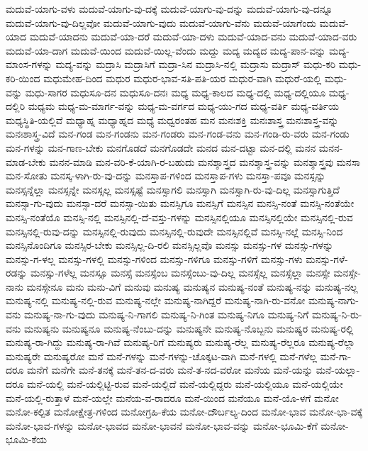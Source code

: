 {ಮದುವೆ-ಯಾಗು-ವಳು
ಮದುವೆ-ಯಾಗು-ವು-ದಕ್ಕೆ
ಮದುವೆ-ಯಾಗು-ವು-ದನ್ನು
ಮದುವೆ-ಯಾಗು-ವು-ದನ್ನೂ
ಮದುವೆ-ಯಾಗು-ವು-ದಿಲ್ಲವೋ
ಮದುವೆ-ಯಾಗು-ವುದು
ಮದುವೆ-ಯಾಗು-ವೆನು
ಮದುವೆ-ಯಾಗೆಂದು
ಮದುವೆ-ಯಾದ
ಮದುವೆ-ಯಾದನು
ಮದುವೆ-ಯಾ-ದರೆ
ಮದುವೆ-ಯಾ-ದಳು
ಮದುವೆ-ಯಾದ-ವನು
ಮದುವೆ-ಯಾದ-ವರು
ಮದುವೆ-ಯಾ-ದಾಗ
ಮದುವೆ-ಯಿಂದ
ಮದುವೆ-ಯಿಲ್ಲ-ವೆಂದು
ಮದ್ದು
ಮದ್ಯ
ಮದ್ಯದ
ಮದ್ಯ-ಪಾನ-ವನ್ನು
ಮದ್ಯ-ಮಾಂಸ-ಗಳನ್ನು
ಮದ್ಯ-ವನ್ನು
ಮದ್ರಾಸಿ
ಮದ್ರಾಸಿಗೆ
ಮದ್ರಾ-ಸಿನ
ಮದ್ರಾಸಿ-ನಲ್ಲಿ
ಮದ್ರಾಸು
ಮದ್ರಾಸ್
ಮಧು-ಕರಿ
ಮಧು-ಕರಿ-ಯಿಂದ
ಮಧುಮೇಹ-ದಿಂದ
ಮಧುರ
ಮಧುರ-ಭಾವ-ಸತಿ-ಪತಿ-ಯರ
ಮಧುರ-ವಾಗಿ
ಮಧುರೆ-ಯಲ್ಲಿ
ಮಧು-ವನ್ನು
ಮಧು-ಸಾಗರ
ಮಧುಸೂ-ದನ
ಮಧುಸೂ-ದನಃ
ಮಧ್ಯ
ಮಧ್ಯ-ಕಾಲದ
ಮಧ್ಯ-ದಲ್ಲಿ
ಮಧ್ಯ-ದಲ್ಲಿಯೂ
ಮಧ್ಯ-ದಲ್ಲಿರಿ
ಮಧ್ಯಮ
ಮಧ್ಯ-ಮ-ಮಾರ್ಗ-ವನ್ನು
ಮಧ್ಯ-ಮ-ವರ್ಗದ
ಮಧ್ಯ-ಯು-ಗದ
ಮಧ್ಯ-ವರ್ತಿ
ಮಧ್ಯ-ವರ್ತಿಯ
ಮಧ್ಯಸ್ಥಿತಿ-ಯಲ್ಲಿವೆ
ಮಧ್ಯಾಹ್ನ
ಮಧ್ಯಾಹ್ನದ
ಮಧ್ಯೆ
ಮಧ್ವರಂತಹ
ಮನ
ಮನಃಶಕ್ತಿ
ಮನಃಶಾಸ್ತ್ರ
ಮನಃಶಾಸ್ತ್ರ-ವನ್ನು
ಮನಃಶಾಸ್ತ್ರ-ವಿದೆ
ಮನ-ಗಂಡ
ಮನ-ಗಂಡನು
ಮನ-ಗಂಡರು
ಮನ-ಗಂಡ-ವನು
ಮನ-ಗಂಡಿ-ರು-ವರು
ಮನ-ಗಂಡು
ಮನ-ಗಳನ್ನು
ಮನ-ಗಾಣ-ಬೇಕು
ಮನಗೊಡದೆ
ಮನಗೊಡದೇ
ಮನದ
ಮನ-ದಟ್ಟಾ
ಮನ-ದಲ್ಲಿ
ಮನನ
ಮನನ-ಮಾಡ-ಬೇಕು
ಮನನ-ಮಾಡಿ
ಮನ-ವರಿ-ಕೆ-ಯಾಗಿ-ರ-ಬಹುದು
ಮನಶ್ಶಾಸ್ತ್ರದ
ಮನಶ್ಶಾಸ್ತ್ರ-ವನ್ನು
ಮನಶ್ಶಾಸ್ತ್ರವು
ಮನಸಾ
ಮನ-ಸೋತು
ಮನಸ್ಕ-ಳಾಗಿ-ರು-ವು-ದನ್ನು
ಮನಸ್ತಾಪ-ಗಳಿಂದ
ಮನಸ್ತಾಪ-ಗಳು
ಮನಸ್ತಾ-ಪವೂ
ಮನಸ್ಸನ್ನು
ಮನಸ್ಸನ್ನೆಲ್ಲಾ
ಮನಸ್ಸನ್ನೇ
ಮನಸ್ಸಲ್ಲ
ಮನಸ್ಸಷ್ಟೆ
ಮನಸ್ಸಾಗಲಿ
ಮನಸ್ಸಾಗಿ
ಮನಸ್ಸಾಗಿ-ರು-ವು-ದಿಲ್ಲ
ಮನಸ್ಸಾಗುತ್ತಿದೆ
ಮನಸ್ಸಾ-ಗು-ವುದು
ಮನಸ್ಸಾ-ದರೆ
ಮನಸ್ಸಾ-ಯಿತು
ಮನಸ್ಸಿಗೂ
ಮನಸ್ಸಿಗೆ
ಮನಸ್ಸಿನ
ಮನಸ್ಸಿ-ನಂತೆ
ಮನಸ್ಸಿ-ನಂತೆಯೇ
ಮನಸ್ಸಿ-ನಂತೆಯೊ
ಮನಸ್ಸಿ-ನಲ್ಲಿ
ಮನಸ್ಸಿನಲ್ಲಿ-ದೆ-ವಸ್ತು-ಗಳನ್ನು
ಮನಸ್ಸಿನಲ್ಲಿಯೂ
ಮನಸ್ಸಿನಲ್ಲಿಯೇ
ಮನಸ್ಸಿನಲ್ಲಿ-ರುವ
ಮನಸ್ಸಿನಲ್ಲಿ-ರುವು-ದನ್ನು
ಮನಸ್ಸಿನಲ್ಲಿ-ರುವುದು
ಮನಸ್ಸಿನಲ್ಲಿ-ರುವುದೇ
ಮನಸ್ಸಿನಲ್ಲಿವೆ
ಮನಸ್ಸಿ-ನಲ್ಲೆ
ಮನಸ್ಸಿ-ನಿಂದ
ಮನಸ್ಸಿನೊಂದಿಗೂ
ಮನಸ್ಸಿರ-ಬೇಕು
ಮನಸ್ಸಿಲ್ಲ-ದಿ-ರಲಿ
ಮನಸ್ಸಿಲ್ಲವೊ
ಮನಸ್ಸು
ಮನಸ್ಸು-ಗಳ
ಮನಸ್ಸು-ಗಳನ್ನು
ಮನಸ್ಸು-ಗ-ಳಲ್ಲ
ಮನಸ್ಸು-ಗಳಲ್ಲಿ
ಮನಸ್ಸು-ಗಳಿಂದ
ಮನಸ್ಸು-ಗಳಿಗೂ
ಮನಸ್ಸು-ಗಳಿಗೆ
ಮನಸ್ಸು-ಗಳು
ಮನಸ್ಸು-ಗಳೆ-ರಡನ್ನು
ಮನಸ್ಸು-ಗಳೆಲ್ಲ
ಮನಸ್ಸೂ
ಮನಸ್ಸೆ
ಮನಸ್ಸೆಂಬ
ಮನಸ್ಸೆಂಬು-ವು-ದಿಲ್ಲ
ಮನಸ್ಸೆಲ್ಲ
ಮನಸ್ಸೆಲ್ಲಾ
ಮನಸ್ಸೇ
ಮನಸ್ಸೇ-ನಾನು
ಮನಸ್ಸೇನೂ
ಮನು
ಮನು-ವಿಗೆ
ಮನುವು
ಮನುಷ್ಯ
ಮನುಷ್ಯನ
ಮನುಷ್ಯ-ನಂತೆ
ಮನುಷ್ಯ-ನನ್ನು
ಮನುಷ್ಯ-ನಲ್ಲ
ಮನುಷ್ಯ-ನಲ್ಲಿ
ಮನುಷ್ಯ-ನಲ್ಲಿ-ರುವ
ಮನುಷ್ಯ-ನಲ್ಲೇ
ಮನುಷ್ಯ-ನಾಗಿದ್ದರೆ
ಮನುಷ್ಯ-ನಾಗಿ-ರು-ವನೋ
ಮನುಷ್ಯ-ನಾಗು-ವನು
ಮನುಷ್ಯ-ನಾ-ಗು-ವುದು
ಮನುಷ್ಯ-ನಿ-ಗಾಗಲಿ
ಮನುಷ್ಯ-ನಿ-ಗಿಂತ
ಮನುಷ್ಯ-ನಿಗೂ
ಮನುಷ್ಯ-ನಿಗೆ
ಮನುಷ್ಯ-ನಿ-ರು-ವನು
ಮನುಷ್ಯನು
ಮನುಷ್ಯನೂ
ಮನುಷ್ಯ-ನೆಂಬು-ದನ್ನು
ಮನುಷ್ಯನೇ
ಮನುಷ್ಯ-ನೊಬ್ಬನು
ಮನುಷ್ಯರ
ಮನುಷ್ಯ-ರಲ್ಲಿ
ಮನುಷ್ಯ-ರಾ-ಗಿದ್ದು
ಮನುಷ್ಯ-ರಾ-ಗಿವೆ
ಮನುಷ್ಯ-ರಿಗೆ
ಮನುಷ್ಯರು
ಮನುಷ್ಯ-ರೆಲ್ಲ
ಮನುಷ್ಯ-ರೆಲ್ಲರೂ
ಮನುಷ್ಯ-ರೆಲ್ಲಾ
ಮನುಷ್ಯರೇ
ಮನುಷ್ಯರೋ
ಮನೆ
ಮನೆ-ಗಳನ್ನು
ಮನೆ-ಗಳನ್ನು-ಚೊಕ್ಕಟ-ವಾಗಿ
ಮನೆ-ಗಳಲ್ಲಿ
ಮನೆ-ಗಳೆಲ್ಲ
ಮನೆ-ಗಾ-ದರೂ
ಮನೆಗೆ
ಮನೆಗೇ
ಮನೆ-ತನಕ್ಕೆ
ಮನೆ-ತನ-ದ-ವರು
ಮನೆ-ತ-ನದ-ವರೋ
ಮನೆಯ
ಮನೆ-ಯನ್ನು
ಮನೆ-ಯಲ್ಲಾ-ದರೂ
ಮನೆ-ಯಲ್ಲಿ
ಮನೆ-ಯಲ್ಲಿಟ್ಟಿ-ರುವ
ಮನೆ-ಯಲ್ಲಿದೆ
ಮನೆ-ಯಲ್ಲಿದ್ದರು
ಮನೆ-ಯಲ್ಲಿಯೂ
ಮನೆ-ಯಲ್ಲಿಯೇ
ಮನೆ-ಯಲ್ಲಿ-ರುತ್ತಾಳೆ
ಮನೆ-ಯಲ್ಲೇ
ಮನೆಯ-ವ-ರಾದರೂ
ಮನೆ-ಯಿಂದ
ಮನೆಯೂ
ಮನೆ-ಯೊ-ಳಗೆ
ಮನೋ
ಮನೋ-ಕಲ್ಪಿತ
ಮನೋಕ್ಷೇತ್ರ-ಗಳಿಂದ
ಮನೋಗ್ರಹಿ-ಕೆಯ
ಮನೋ-ದೌರ್ಬಲ್ಯ-ದಿಂದ
ಮನೋ-ಭಾವ
ಮನೋ-ಭಾ-ವಕ್ಕೆ
ಮನೋ-ಭಾವ-ಗಳನ್ನು
ಮನೋ-ಭಾವದ
ಮನೋ-ಭಾವನೆ
ಮನೋ-ಭಾವ-ವನ್ನು
ಮನೋ-ಭೂಮಿ-ಕೆಗೆ
ಮನೋ-ಭೂಮಿ-ಕೆಯ
}
